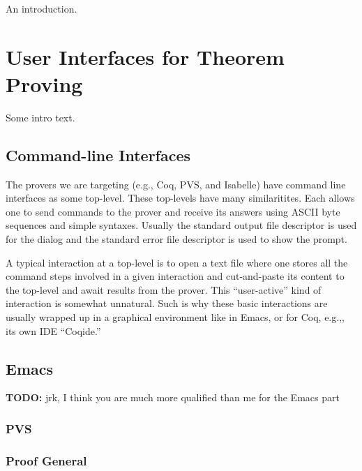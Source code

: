 \documentclass{entcs}
\newcommand{\todo}{\textbf{TODO: }}
\newcommand{\eg}{e.g.,\xspace}
\begin{document}
An introduction.

\section{User Interfaces for Theorem Proving}
\label{sec:user-interf-theor}

Some intro text. %

\subsection{Command-line Interfaces}
\label{subsec:comm-line-interf}

The provers we are targeting (\eg Coq, PVS, and Isabelle) have command
line interfaces as some top-level.  These top-levels have many
similaritites.  Each allows one to send commands to the prover and
receive its answers using ASCII byte sequences and simple syntaxes.
Usually the standard output file descriptor is used for the dialog and
the standard error file descriptor is used to show the prompt.

A typical interaction at a top-level is to open a text file where one
stores all the command steps involved in a given interaction and
cut-and-paste its content to the top-level and await results from the
prover.  This ``user-active'' kind of interaction is somewhat
unnatural.  Such is why these basic interactions are usually wrapped
up in a graphical environment like in Emacs, or for Coq, \eg, its own
IDE ``Coqide.''

\subsection{Emacs}
\label{subsec:emacs}

\todo{jrk, I think you are much more qualified than me for the Emacs
  part} %

\subsubsection{PVS}


\subsubsection{Proof General}
\end{document}
